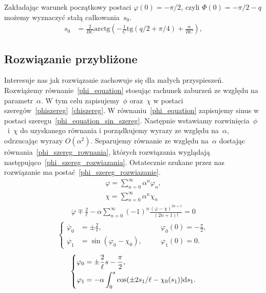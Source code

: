 Zakładając warunek początkowy postaci $\varphi(0) = -\pi/2$, 
czyli $\Phi(0) = -\pi/2 - q$ możemy wyznaczyć stałą całkowania~$s_0$.
\begin{align*}
s_0 & = \frac{2}{BC} \text{arctg}  
\left( - \frac{1}{C}\text{tg} (q/2 + \pi/4) +\frac{\alpha}{BC} \right),
\end{align*}

\newpage
\subsection{Rozwiązanie przybliżone}
Interesuje nas jak rozwiązanie zachowuje się dla małych przyspieszeń. 
Rozwiążemy równanie~\eqref{phi_equation} stosując 
rachunek zaburzeń ze względu na 
parametr~$\alpha$. W tym celu zapisujemy~$\phi$ oraz~$\chi$ w postaci
szeregów~\eqref{phiszereg}~\eqref{chiszereg}. 
W równaniu~\eqref{phi_equation} zapisujemy sinus w postaci 
szeregu~\eqref{phi_equation_sin_szereg}. Następnie wstawiamy 
rozwinięcia~$\phi$~i~$\chi$ do uzyskanego równania i porządkujemy wyrazy
ze względu na~$\alpha$, odrzucając wyrazy $O(\alpha^2)$. 
Separujemy równanie ze względu na~$\alpha$ dostając 
równania~\eqref{phi_szereg_rownania}, 
których rozwiązania wyglądają 
następująco~\eqref{phi_szereg_rozwiazania}.
Ostatecznie szukane przez nas rozwiązanie ma 
postać~\eqref{phi_szereg_rozwiazanie}.
\begin{align}\label{phiszereg}
\varphi = \sum_{n=0}^{\infty} \alpha^n \varphi_n, \\
\chi = \sum_{n=0}^{\infty} \alpha^n \chi_n  \label{chiszereg}
\end{align}
\begin{align}\label{phi_equation_sin_szereg}
\dot{\varphi} \mp \frac{2}{\ell} - \alpha
\sum_{n=0}^{\infty} (-1)^n 
\frac{(\varphi-\chi)^{2n+1}}{(2n+1)!} =0
\end{align}
\begin{align}\label{phi_szereg_rownania}
\left\{ 
\begin{aligned}
\dot{\varphi_0} & = \pm \frac{2}{\ell} , &\quad & 
\varphi_0(0)=-\frac{\pi}{2},\\
\dot{\varphi_1} & = \sin (\varphi_0 - \chi_0  ), &\quad & 
\varphi_1(0) = 0 .
\end{aligned}
\right.
\end{align}
\begin{align}\label{phi_szereg_rozwiazania}
\left\{ 
\begin{aligned}
\varphi_0 & =  \pm \frac{2}{\ell}s - \frac{\pi}{2},\\
\varphi_1 & =  -\alpha \int_0^s \cos 
(\pm 2 s_1 / \ell  - \chi_0(s_1)  ) \text{d} s_1 .
\end{aligned}
\right.
\end{align}

